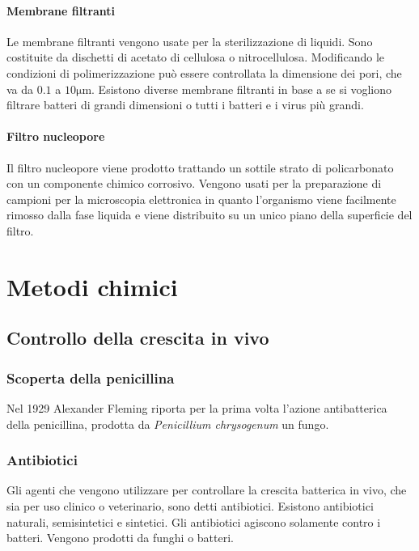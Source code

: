 			\paragraph{Membrane filtranti}
			Le membrane filtranti vengono usate per la sterilizzazione di liquidi.
			Sono costituite da dischetti di acetato di cellulosa o nitrocellulosa.
			Modificando le condizioni di polimerizzazione pu\`o essere controllata la dimensione dei pori, che va da $0.1$ a $10\si{\micro\metre}$.
			Esistono diverse membrane filtranti in base a se si vogliono filtrare batteri di grandi dimensioni o tutti i batteri e i virus pi\`u grandi.

			\paragraph{Filtro nucleopore}
			Il filtro nucleopore viene prodotto trattando un sottile strato di policarbonato con un componente chimico corrosivo.
			Vengono usati per la preparazione di campioni per la microscopia elettronica in quanto l'organismo viene facilmente rimosso dalla fase liquida e viene distribuito su un unico piano della superficie del filtro.
\section{Metodi chimici}

	\subsection{Controllo della crescita in vivo}

		\subsubsection{Scoperta della penicillina}
		Nel 1929 Alexander Fleming riporta per la prima volta l'azione antibatterica della penicillina, prodotta da \textit{Penicillium chrysogenum} un fungo.
		
		\subsubsection{Antibiotici}
		Gli agenti che vengono utilizzare per controllare la crescita batterica in vivo, che sia per uso clinico o veterinario, sono detti antibiotici. 
		Esistono antibiotici naturali, semisintetici e sintetici. 
		Gli antibiotici agiscono solamente contro i batteri.
		Vengono prodotti da funghi o batteri.

